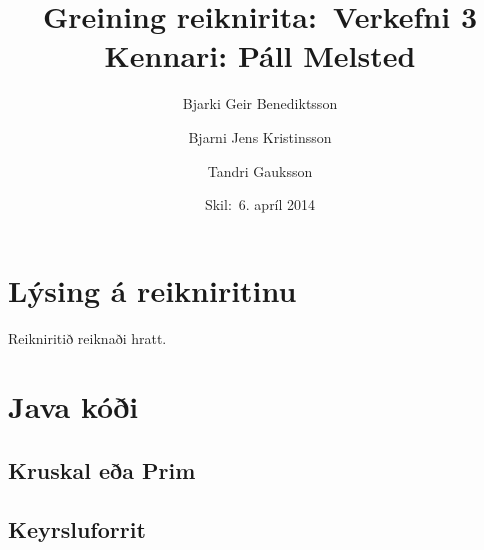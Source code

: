 \documentclass[a4paper,oneside]{article}
\title{
    Greining reiknirita:\ Verkefni 3
    \\\small{Kennari: Páll Melsted}
}
\author{Bjarki Geir Benediktsson \and  Bjarni Jens Kristinsson \and Tandri Gauksson}
\date{\small{Skil:\ 6. apríl 2014}}
\begin{document}
\maketitle

\section{Lýsing á reikniritinu}
Reikniritið reiknaði hratt.

\pagebreak
\section{Java kóði}
\subsection{Kruskal eða Prim}

\subsection{Keyrsluforrit}
\end{document}
